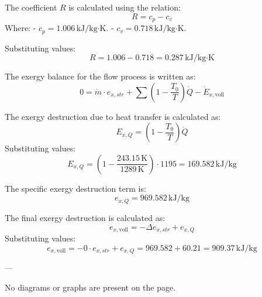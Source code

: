 The coefficient \( R \) is calculated using the relation:  
\[
R = c_p - c_v
\]  
Where:  
- \( c_p = 1.006 \, \text{kJ/kg·K} \).  
- \( c_v = 0.718 \, \text{kJ/kg·K} \).  

Substituting values:  
\[
R = 1.006 - 0.718 = 0.287 \, \text{kJ/kg·K}
\]

The exergy balance for the flow process is written as:  
\[
0 = \dot{m} \cdot e_{x,str} + \sum \left( 1 - \frac{T_0}{T} \right) \dot{Q} - \dot{E}_{x,\text{voll}}
\]  

The exergy destruction due to heat transfer is calculated as:  
\[
E_{x,Q} = \left( 1 - \frac{T_0}{T} \right) \dot{Q}
\]  
Substituting values:  
\[
E_{x,Q} = \left( 1 - \frac{243.15 \, \text{K}}{1289 \, \text{K}} \right) \cdot 1195 = 169.582 \, \text{kJ/kg}
\]  

The specific exergy destruction term is:  
\[
e_{x,Q} = 969.582 \, \text{kJ/kg}
\]  

The final exergy destruction is calculated as:  
\[
e_{x,\text{voll}} = - \Delta e_{x,str} + e_{x,Q}
\]  
Substituting values:  
\[
e_{x,\text{voll}} = -0 \cdot e_{x,str} + e_{x,Q} = 969.582 + 60.21 = 909.37 \, \text{kJ/kg}
\]  

---

No diagrams or graphs are present on the page.